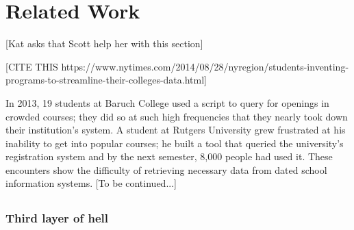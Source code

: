 \section{Related Work}
[Kat asks that Scott help her with this section]

[CITE THIS https://www.nytimes.com/2014/08/28/nyregion/students-inventing-programs-to-streamline-their-colleges-data.html] 

In 2013, 19 students at Baruch College used a script to query for openings in crowded courses; they did so at such high frequencies that they nearly took down their institution's system. A student at Rutgers University grew frustrated at his inability to get into popular courses; he built a tool that queried the university's registration system and by the next semester, 8,000 people had used it. These encounters show the difficulty of retrieving necessary data from dated school information systems. 
[To be continued...]
\subsection{}

\subsubsection{Third layer of hell}

